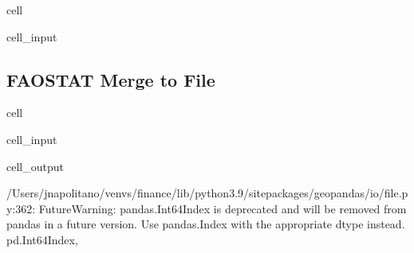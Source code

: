 \documentclass[letterpaper,10pt,english]{jupyterBook}
\begin{document}
\begin{sphinxuseclass}{cell}\begin{sphinxVerbatimInput}

\begin{sphinxuseclass}{cell_input}
\begin{sphinxVerbatim}[commandchars=\\\{\}]
  \PYG{p}{[}\PYG{p}{[}\PYG{p}{]}  \PYG{p}{]}
\end{sphinxVerbatim}

\end{sphinxuseclass}\end{sphinxVerbatimInput}

\end{sphinxuseclass}

\subsection{FAOSTAT Merge to File}
\label{\detokenize{notebooks/geo_coding:faostat-merge-to-file}}
\begin{sphinxuseclass}{cell}\begin{sphinxVerbatimInput}

\begin{sphinxuseclass}{cell_input}
\begin{sphinxVerbatim}[commandchars=\\\{\}]
  
 
\end{sphinxVerbatim}

\end{sphinxuseclass}\end{sphinxVerbatimInput}
\begin{sphinxVerbatimOutput}

\begin{sphinxuseclass}{cell_output}
\begin{sphinxVerbatim}[commandchars=\\\{\}]
/Users/jnapolitano/venvs/finance/lib/python3.9/site\PYGZhy{}packages/geopandas/io/file.py:362: FutureWarning: pandas.Int64Index is deprecated and will be removed from pandas in a future version. Use pandas.Index with the appropriate dtype instead.
  pd.Int64Index,
\end{sphinxVerbatim}

\end{sphinxuseclass}\end{sphinxVerbatimOutput}

\end{sphinxuseclass}
\end{document}
